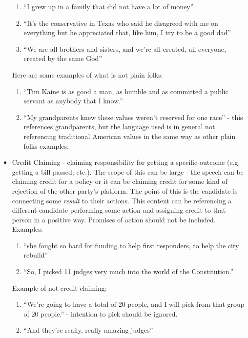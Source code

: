 \documentclass[letterpaper]{article}
\begin{document}
\begin{itemize}
\begin{enumerate}
		\item ``I grew up in a family that did not have a lot of money''
		\item ``It’s the conservative in Texas who said he disagreed with me on everything but he appreciated that, like him, I try to be a good dad''
		\item ``We are all brothers and sisters, and we’re all created, all everyone, created by the same God''
	\end{enumerate}
	Here are some examples of what is not plain folks: \\
	\begin{enumerate}
		\item ``Tim Kaine is as good a man, as humble and as committed a public servant as anybody that I know.''
		\item ``My grandparents knew these values weren’t reserved for one race'' - this references grandparents, but the language used is in general not referencing traditional American values in the same way as other plain folks examples.
	\end{enumerate}
	\item Credit Claiming - claiming responsibility for getting a specific outcome (e.g. getting a bill passed, etc.). The scope of this can be large - the speech can be claiming credit for a policy or it can be claiming credit for some kind of rejection of the other party's platform. The point of this is the candidate is connecting some \emph{result} to their actions. This content can be referencing a different candidate performing some action and assigning credit to that person in a positive way. Promises of action should not be included. \\Examples: \\
	\begin{enumerate}
		\item ``she fought so hard for funding to help first responders, to help the city rebuild''
		\item ``So, I picked 11 judges very much into the world of the Constitution.''
	\end{enumerate}
	Example of not credit claiming:
	\begin{enumerate}
		\item ``We’re going to have a total of 20 people, and I will pick from that group of 20 people.'' - intention to pick should be ignored.
		\item ``And they’re really, really amazing judges''
	\end{enumerate}

\end{itemize}
\end{document}

